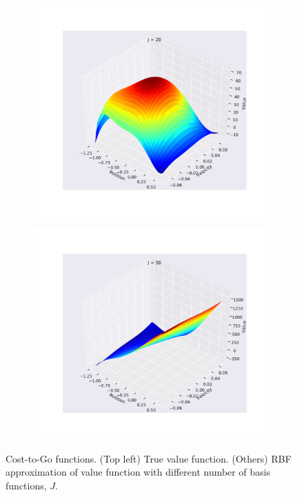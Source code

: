 \documentclass{article}
\begin{document}
\begin{figure}
    \begin{subfigure}{.49\linewidth}
        \centering
        \includegraphics[width=\linewidth]{Figures/rbf_value_function_20.pdf}
    \end{subfigure}
    \begin{subfigure}{.49\linewidth}
        \centering
        \includegraphics[width=\linewidth]{Figures/rbf_value_function_50.pdf}
    \end{subfigure}
    \caption{Cost-to-Go functions. (Top left) True value function. (Others) RBF approximation of value function with different number of basis functions, $J$.}
    \label{fig:value-functions}
\end{figure}
\end{document}
